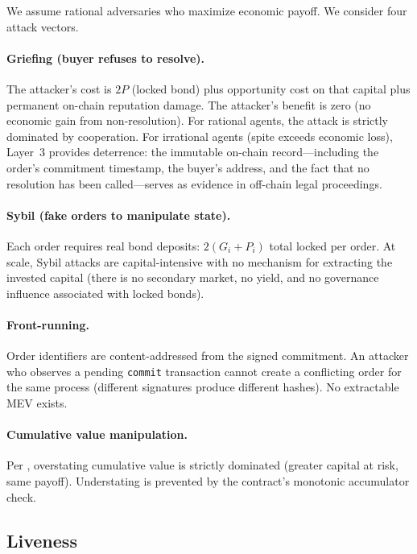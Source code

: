 \documentclass[11pt,a4paper]{article}
\theoremstyle{definition}
\theoremstyle{remark}
\newcommand{\pay}{P}           %
\newcommand{\cumval}{G}        %
\begin{document}
We assume rational adversaries who maximize economic payoff. We consider
four attack vectors.

\paragraph{Griefing (buyer refuses to resolve).}
The attacker's cost is $2\pay$ (locked bond) plus opportunity cost on
that capital plus permanent on-chain reputation damage. The attacker's
benefit is zero (no economic gain from non-resolution). For rational
agents, the attack is strictly dominated by cooperation. For irrational
agents (spite exceeds economic loss), Layer~3 provides deterrence: the
immutable on-chain record---including the order's commitment timestamp,
the buyer's address, and the fact that no resolution has been
called---serves as evidence in off-chain legal proceedings.

\paragraph{Sybil (fake orders to manipulate state).}
Each order requires real bond deposits:
$2(\cumval_i + \pay_i)$ total locked per order. At scale, Sybil attacks
are capital-intensive with no mechanism for extracting the invested
capital (there is no secondary market, no yield, and no governance
influence associated with locked bonds).

\paragraph{Front-running.}
Order identifiers are content-addressed from the signed commitment. An
attacker who observes a pending \texttt{commit} transaction cannot
create a conflicting order for the same process (different signatures
produce different hashes). No extractable MEV exists.

\paragraph{Cumulative value manipulation.}
Per , overstating cumulative value is
strictly dominated (greater capital at risk, same payoff). Understating
is prevented by the contract's monotonic accumulator check.

\subsection{Liveness}
\end{document}
